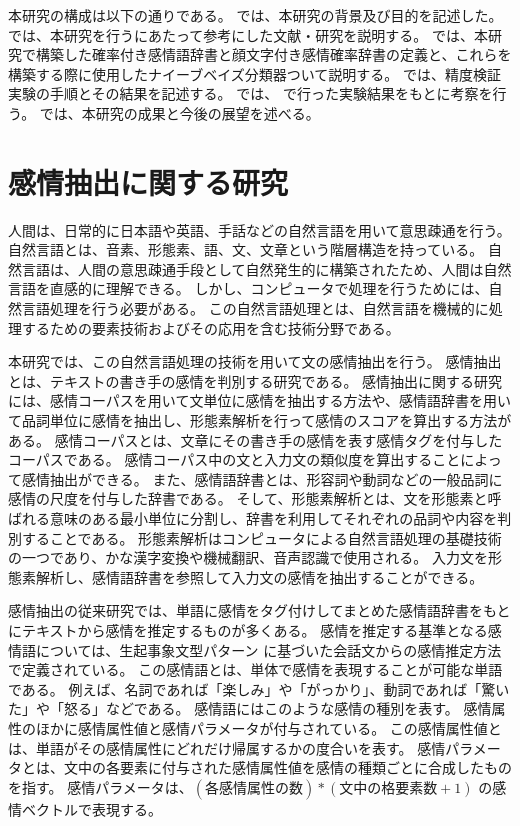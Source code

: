 \documentclass[11pt,a4j]{jsarticle}
\begin{document}
本研究の構成は以下の通りである。
 では、本研究の背景及び目的を記述した。 では、本研究を行うにあたって参考にした文献・研究を説明する。
 では、本研究で構築した確率付き感情語辞書と顔文字付き感情確率辞書の定義と、これらを構築する際に使用したナイーブベイズ分類器ついて説明する。
では、精度検証実験の手順とその結果を記述する。
では、 で行った実験結果をもとに考察を行う。
では、本研究の成果と今後の展望を述べる。

\section{感情抽出に関する研究}\label{sec:relatedworks}
人間は、日常的に日本語や英語、手話などの自然言語を用いて意思疎通を行う。
自然言語とは、音素、形態素、語、文、文章という階層構造を持っている。
自然言語は、人間の意思疎通手段として自然発生的に構築されたため、人間は自然言語を直感的に理解できる。
しかし、コンピュータで処理を行うためには、自然言語処理を行う必要がある。
この自然言語処理とは、自然言語を機械的に処理するための要素技術およびその応用を含む技術分野である。

本研究では、この自然言語処理の技術を用いて文の感情抽出を行う。
感情抽出とは、テキストの書き手の感情を判別する研究である。
感情抽出に関する研究には、感情コーパスを用いて文単位に感情を抽出する方法や、感情語辞書を用いて品詞単位に感情を抽出し、形態素解析を行って感情のスコアを算出する方法がある。
感情コーパスとは、文章にその書き手の感情を表す感情タグを付与したコーパスである。
感情コーパス中の文と入力文の類似度を算出することによって感情抽出ができる。
また、感情語辞書とは、形容詞や動詞などの一般品詞に感情の尺度を付与した辞書である。
そして、形態素解析とは、文を形態素と呼ばれる意味のある最小単位に分割し、辞書を利用してそれぞれの品詞や内容を判別することである。
形態素解析はコンピュータによる自然言語処理の基礎技術の一つであり、かな漢字変換や機械翻訳、音声認識で使用される。
入力文を形態素解析し、感情語辞書を参照して入力文の感情を抽出することができる。

感情抽出の従来研究では、単語に感情をタグ付けしてまとめた感情語辞書をもとにテキストから感情を推定するものが多くある。
感情を推定する基準となる感情語については、生起事象文型パターン  に基づいた会話文からの感情推定方法で定義されている。
この感情語とは、単体で感情を表現することが可能な単語である。
例えば、名詞であれば「楽しみ」や「がっかり」、動詞であれば「驚いた」や「怒る」などである。
感情語にはこのような感情の種別を表す。
感情属性のほかに感情属性値と感情パラメータが付与されている。
この感情属性値とは、単語がその感情属性にどれだけ帰属するかの度合いを表す。
感情パラメータとは、文中の各要素に付与された感情属性値を感情の種類ごとに合成したものを指す。
感情パラメータは、$(各感情属性の数) * (文中の格要素数 +1)$ の感情ベクトルで表現する。
\end{document}
